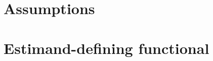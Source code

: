 \documentclass[11pt]{article}
\newcommand{\E}{\mathbb{E}}
\theoremstyle{definition}
\theoremstyle{plain}
\theoremstyle{remark}
\begin{document}
%

\section{Assumptions}

\section{Estimand-defining functional}
\end{document}
